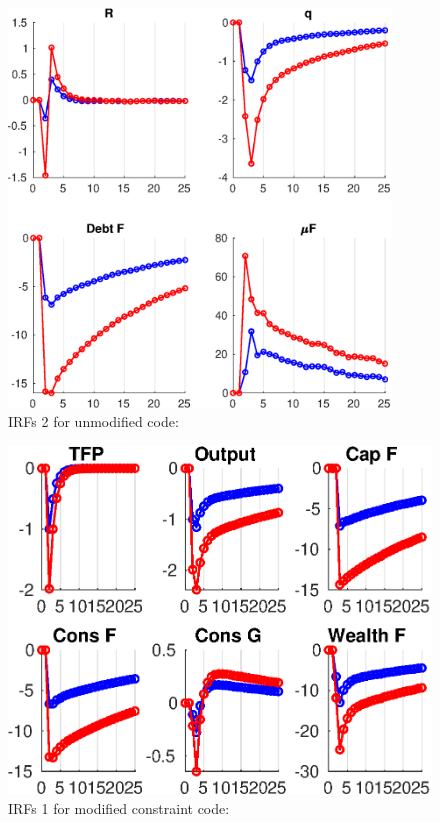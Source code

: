 \documentclass{article}
\begin{document}
\begin{figure}
\caption{IRFs 2 for unmodified code:}
\includegraphics [width=4in]{PS03_projection_code_modif/Results/GR_orig_diff_IRF2.eps}
\end{figure}



\begin{figure}
\caption{IRFs 1 for modified constraint code:}
\includegraphics [width=5in]{PS03_projection_code_modif/Results/GR_res_converge1_diff_IRF1.eps}
\end{figure}
\end{document}
